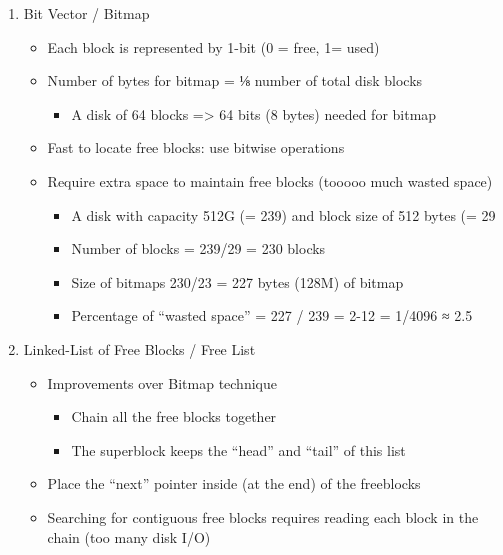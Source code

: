\documentclass[11pt]{article}
\begin{document}
\begin{enumerate}
\item Bit Vector / Bitmap
	\begin{itemize}
  	\item Each block is represented by 1-bit (0 = free, 1= used)
  	\item Number of bytes for bitmap = ⅛ number of total disk blocks
  		\begin{itemize}
  		\item A disk of 64 blocks => 64 bits (8 bytes) needed for bitmap
  		\end{itemize}
  	\item Fast to locate free blocks: use bitwise operations
  	\item Require extra space to maintain free blocks (tooooo much wasted space)
  		\begin{itemize}
  		\item A disk with capacity 512G (= 239) and block size of 512 bytes (= 29
  		\item Number of blocks = 239/29 = 230 blocks
  		\item Size of bitmaps 230/23 = 227 bytes (128M) of bitmap
  		\item Percentage of “wasted space” = 227 / 239 = 2-12 = 1/4096 ≈ 2.5%
  		\end{itemize}
  	\end{itemize}
  		
\item Linked-List of Free Blocks / Free List
	\begin{itemize}
  	\item Improvements over Bitmap technique
  		\begin{itemize}
  		\item Chain all the free blocks together
  		\item The superblock keeps the “head” and “tail” of this list
  		\end{itemize}
  	\item Place the “next” pointer inside (at the end) of the freeblocks
  	\item Searching for contiguous free blocks requires reading each block in the chain (too many disk I/O)
  	\end{itemize}
  	

\end{enumerate}
\end{document}
